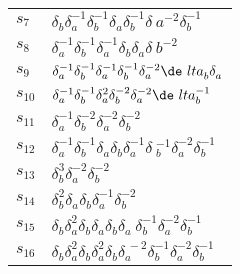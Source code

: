 \documentclass{article}
\begin{document}
\begin{center}
\begin{tabular}{ll}
$s_{7}$ & $\delta_b^{}\delta_a^{-1}\delta_b^{-1}\delta_a^{}\delta_b^{-1}\delta_\
a^{-2}\delta_b^{-1}$ \\
$s_{8}$ & $\delta_a^{-1}\delta_b^{-1}\delta_a^{-1}\delta_b^{}\delta_a^{}\delta_\
b^{-2}$ \\
$s_{9}$ & $\delta_a^{-1}\delta_b^{-1}\delta_a^{-1}\delta_b^{-1}\delta_a^{-2}\de\
lta_b^{}\delta_a^{}$ \\
$s_{10}$ & $\delta_a^{-1}\delta_b^{-1}\delta_a^{2}\delta_b^{-2}\delta_a^{-2}\de\
lta_b^{-1}$ \\
$s_{11}$ & $\delta_a^{-1}\delta_b^{-2}\delta_a^{-2}\delta_b^{-2}$ \\
$s_{12}$ & $\delta_a^{-1}\delta_b^{-1}\delta_a^{}\delta_b^{}\delta_a^{-1}\delta\
_b^{-1}\delta_a^{-2}\delta_b^{-1}$ \\
$s_{13}$ & $\delta_b^{3}\delta_a^{-2}\delta_b^{-2}$ \\
$s_{14}$ & $\delta_b^{2}\delta_a^{}\delta_b^{}\delta_a^{-1}\delta_b^{-2}$ \\
$s_{15}$ & $\delta_b^{}\delta_a^{2}\delta_b^{}\delta_a^{}\delta_b^{}\delta_a^{}\
\delta_b^{-1}\delta_a^{-2}\delta_b^{-1}$ \\
$s_{16}$ & $\delta_b^{}\delta_a^{2}\delta_b^{}\delta_a^{2}\delta_b^{}\delta_a^{\
-2}\delta_b^{-1}\delta_a^{-2}\delta_b^{-1}$ \\
\bottomrule
\end{tabular}
\end{center}

\thispagestyle{empty}
\end{document}
